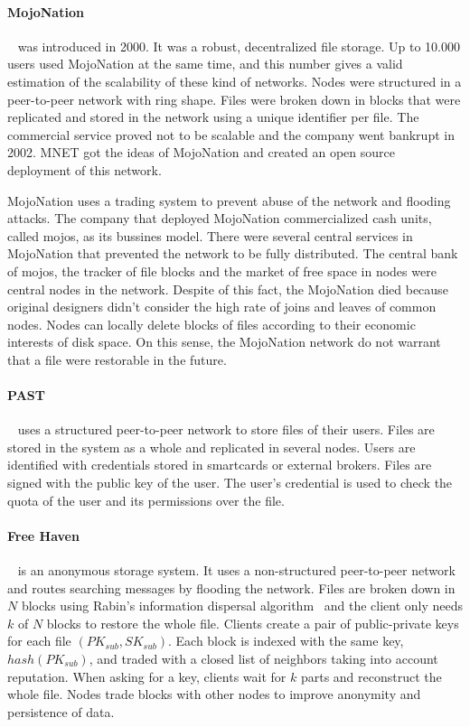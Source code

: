 \documentclass{llncs}
\begin{document}
\paragraph{MojoNation}~\cite{MOJO} was introduced in 2000. It was a robust, decentralized file storage. Up to 10.000 users used MojoNation at the same time, and this number gives a valid estimation of the scalability of these kind of networks. Nodes were structured in a peer-to-peer network with ring shape. Files were broken down in blocks that were replicated and stored in the network using a unique identifier per file. The commercial service proved not to be scalable and the company went bankrupt in 2002. MNET got the ideas of MojoNation and created an open source deployment of this network.

MojoNation uses a trading system to prevent abuse of the network and flooding attacks. The company that deployed MojoNation commercialized cash units, called mojos, as its bussines model. There were several central services in MojoNation that prevented the network to be fully distributed. The central bank of mojos, the tracker of file blocks and the market of free space in nodes were central nodes in the network. Despite of this fact, the MojoNation died because original designers didn't consider the high rate of joins and leaves of common nodes. Nodes can locally delete blocks of files according to their economic interests of disk space. On this sense, the MojoNation network do not warrant that a file were restorable in the future.

\paragraph{PAST}~\cite{PAST} uses a structured peer-to-peer network to store files of their users. Files are stored in the system as a whole and replicated in several nodes. Users are identified with credentials stored in smartcards or external brokers. Files are signed with the public key of the user. The user's credential is used to check the quota of the user and its permissions over the file.

\paragraph{Free Haven}~\cite{FREEHAVEN} is an anonymous storage system. It uses a non-structured peer-to-peer network and routes searching messages by flooding the network. Files are broken down in $N$ blocks using Rabin's information dispersal algorithm~\cite{IDA} and the client only needs $k$ of $N$ blocks to restore the whole file. Clients create a pair of public-private keys for each file $(PK_{sub}, SK_{sub})$. Each block is indexed with the same key, $hash(PK_{sub})$, and traded with a closed list of neighbors taking into account reputation. When asking for a key, clients wait for $k$ parts and reconstruct the whole file. Nodes trade blocks with other nodes to improve anonymity and persistence of data.
\end{document}

